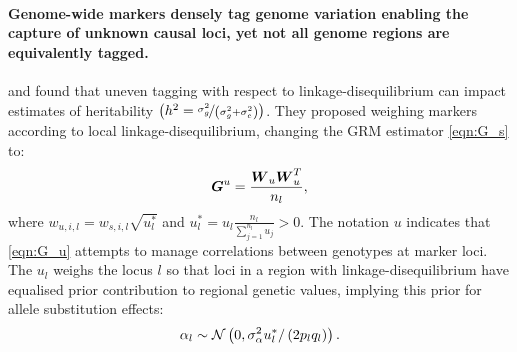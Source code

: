 \paragraph{Genome-wide markers densely tag genome variation
enabling the capture of unknown causal loci, yet not all genome
regions are equivalently tagged.}
%
\cite{speed2012improved} and \cite{speed2017reevaluation} found
that uneven tagging with respect to linkage-disequilibrium can
impact estimates of heritability
$\left(h^2=\nicefrac{\sigma_g^2}{\left(\sigma_g^2 + \sigma_e^2\right)}\right)$.
%
They proposed weighing markers according to local linkage-disequilibrium,
changing the GRM estimator \eqref{eqn:G_s} to:
%
\begin{equation} \label{eqn:G_u}
  \boldsymbol{G}^{u} = \frac{\boldsymbol{W}_u \boldsymbol{W}_u^T}{n_l},
\end{equation}
%
where $w_{u,i,l} = w_{s,i,l} \sqrt{u^*_l}$ and
$u^*_l = u_l \frac{n_l}{\sum_{j=1}^{n_l} u_j} > 0$.
%
The notation $u$ indicates that \eqref{eqn:G_u} attempts to manage
correlations between genotypes at marker loci.
%
The $u_l$ weighs the locus $l$ so that loci in a region with
linkage-disequilibrium have equalised prior contribution to regional
genetic values, implying this prior for allele substitution effects:
%
\begin{equation} \label{eqn:alpha_normal_hetero_ld}
  \alpha_l \sim \mathcal{N}\left(0, \sigma_{\alpha}^2 u^*_l / \left(2 p_l q_l\right) \right).
\end{equation}
%
%

